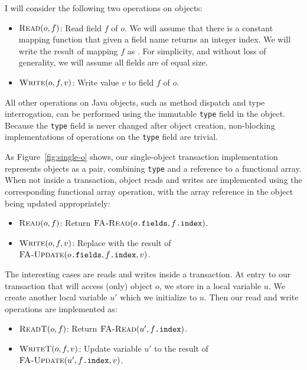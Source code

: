 I will consider the following two operations on objects:
\begin{itemize}
\item $\text{\sc Read}(o, f)$: Read field $f$ of $o$.  We will assume that
  there is a constant mapping function that given a field name
  returns an integer index.  We will write the result of mapping $f$
  as .  For simplicity, and without loss of generality,
  we will assume all fields are of equal size.
\item $\text{\sc Write}(o, f, v)$: Write value $v$ to field $f$ of $o$.
\end{itemize}
All other operations on Java objects, such as method dispatch and type
interrogation, can be performed using the immutable {\tt type}
field in the object.  Because the {\tt type} field is never changed
after object creation, non-blocking implementations of operations on
the {\tt type} field are trivial.

As Figure~\ref{fig:single-o} shows, our single-object transaction
implementation represents objects as a pair, combining {\tt type} and a
reference to a functional array.  When not inside a transaction,
object reads and writes are implemented using the
corresponding functional array operation, with the array reference in
the object being updated appropriately:
\begin{itemize}
\item $\text{\sc Read}(o, f)$:
  Return $\text{\sc FA-Read}(o\text{\tt .fields}, f\text{\tt .index})$.
\item $\text{\sc Write}(o, f, v)$: Replace  with the
  result of \linebreak
  $\text{\sc FA-Update}(o\text{\tt .fields}, f\text{\tt .index}, v)$.
\end{itemize}

The interesting cases are reads and writes inside a transaction.
At entry to our transaction that will access (only) object $o$, we
store  in a local variable $u$.  We create another
local variable $u'$ which we initialize to $u$.  Then our read and
write operations are implemented as:
\begin{itemize}
\item $\text{\sc ReadT}(o, f)$:
  Return $\text{\sc FA-Read}(u', f\text{\tt .index})$.
\item $\text{\sc WriteT}(o, f, v)$:
  Update variable $u'$ to the result of \linebreak
  $\text{\sc FA-Update}(u', f\text{\tt .index}, v)$.
\end{itemize}

